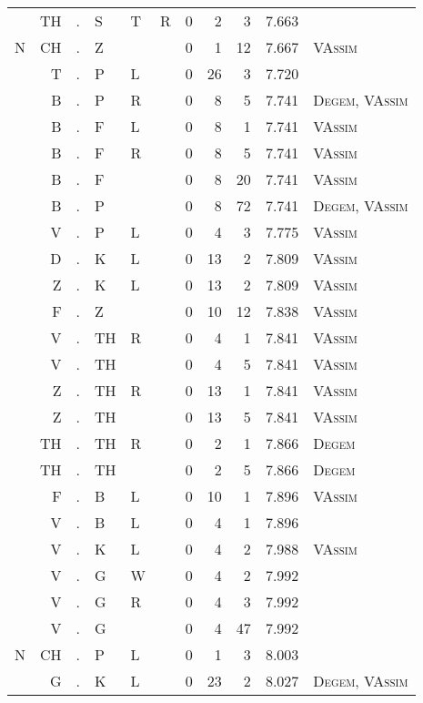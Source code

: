 \begin{longtable}{r@{ } r@{ } c@{ } l@{ } l@{ } l@{ } r r r r l }
  & TH & . & S & T & R & 0 & 2 & 3 & 7.663 &  \\
N & CH & . & Z &   &   & 0 & 1 & 12 & 7.667 & \textsc{VAssim} \\
  & T & . & P & L &   & 0 & 26 & 3 & 7.720 &  \\
  & B & . & P & R &   & 0 & 8 & 5 & 7.741 & \textsc{Degem}, \textsc{VAssim} \\
  & B & . & F & L &   & 0 & 8 & 1 & 7.741 & \textsc{VAssim} \\
  & B & . & F & R &   & 0 & 8 & 5 & 7.741 & \textsc{VAssim} \\
  & B & . & F &   &   & 0 & 8 & 20 & 7.741 & \textsc{VAssim} \\
  & B & . & P &   &   & 0 & 8 & 72 & 7.741 & \textsc{Degem}, \textsc{VAssim} \\
  & V & . & P & L &   & 0 & 4 & 3 & 7.775 & \textsc{VAssim} \\
  & D & . & K & L &   & 0 & 13 & 2 & 7.809 & \textsc{VAssim} \\
  & Z & . & K & L &   & 0 & 13 & 2 & 7.809 & \textsc{VAssim} \\
  & F & . & Z &   &   & 0 & 10 & 12 & 7.838 & \textsc{VAssim} \\
  & V & . & TH & R &   & 0 & 4 & 1 & 7.841 & \textsc{VAssim} \\
  & V & . & TH &   &   & 0 & 4 & 5 & 7.841 & \textsc{VAssim} \\
  & Z & . & TH & R &   & 0 & 13 & 1 & 7.841 & \textsc{VAssim} \\
  & Z & . & TH &   &   & 0 & 13 & 5 & 7.841 & \textsc{VAssim} \\
  & TH & . & TH & R &   & 0 & 2 & 1 & 7.866 & \textsc{Degem} \\
  & TH & . & TH &   &   & 0 & 2 & 5 & 7.866 & \textsc{Degem} \\
  & F & . & B & L &   & 0 & 10 & 1 & 7.896 & \textsc{VAssim} \\
  & V & . & B & L &   & 0 & 4 & 1 & 7.896 &  \\
  & V & . & K & L &   & 0 & 4 & 2 & 7.988 & \textsc{VAssim} \\
  & V & . & G & W &   & 0 & 4 & 2 & 7.992 &  \\
  & V & . & G & R &   & 0 & 4 & 3 & 7.992 &  \\
  & V & . & G &   &   & 0 & 4 & 47 & 7.992 &  \\
N & CH & . & P & L &   & 0 & 1 & 3 & 8.003 &  \\
  & G & . & K & L &   & 0 & 23 & 2 & 8.027 & \textsc{Degem}, \textsc{VAssim} \\

\end{longtable}
